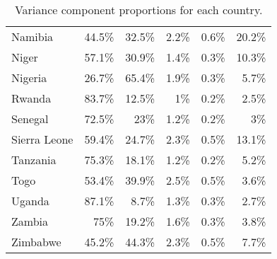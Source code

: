 \documentclass[12pt]{article}\usepackage[]{graphicx}\usepackage[]{color}
\begin{document}
\begin{table}[htb]
\begin{tabular}{lrrrrr}
  Namibia & 44.5\% & 32.5\% & 2.2\% & 0.6\% & 20.2\% \\ 
  Niger & 57.1\% & 30.9\% & 1.4\% & 0.3\% & 10.3\% \\ 
  Nigeria & 26.7\% & 65.4\% & 1.9\% & 0.3\% & 5.7\% \\ 
  Rwanda & 83.7\% & 12.5\% & 1\% & 0.2\% & 2.5\% \\ 
  Senegal & 72.5\% & 23\% & 1.2\% & 0.2\% & 3\% \\ 
  Sierra Leone & 59.4\% & 24.7\% & 2.3\% & 0.5\% & 13.1\% \\ 
  Tanzania & 75.3\% & 18.1\% & 1.2\% & 0.2\% & 5.2\% \\ 
  Togo & 53.4\% & 39.9\% & 2.5\% & 0.5\% & 3.6\% \\ 
  Uganda & 87.1\% & 8.7\% & 1.3\% & 0.3\% & 2.7\% \\ 
  Zambia & 75\% & 19.2\% & 1.6\% & 0.3\% & 3.8\% \\ 
  Zimbabwe & 45.2\% & 44.3\% & 2.3\% & 0.5\% & 7.7\% \\ 
   \hline
\end{tabular}
\caption{Variance component proportions for each country.}
\label{tab:var}
\end{table}


\clearpage
\end{document}
